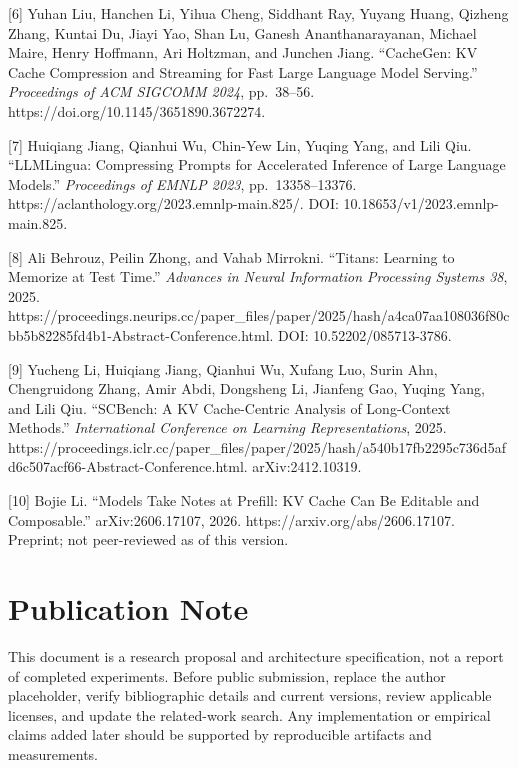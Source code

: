 \documentclass[
  10pt,
]{article}
\begin{document}
{[}6{]} Yuhan Liu, Hanchen Li, Yihua Cheng, Siddhant Ray, Yuyang Huang,
Qizheng Zhang, Kuntai Du, Jiayi Yao, Shan Lu, Ganesh Ananthanarayanan,
Michael Maire, Henry Hoffmann, Ari Holtzman, and Junchen Jiang.
``CacheGen: KV Cache Compression and Streaming for Fast Large Language
Model Serving.'' \emph{Proceedings of ACM SIGCOMM 2024}, pp.~38--56.
https://doi.org/10.1145/3651890.3672274.

{[}7{]} Huiqiang Jiang, Qianhui Wu, Chin-Yew Lin, Yuqing Yang, and Lili
Qiu. ``LLMLingua: Compressing Prompts for Accelerated Inference of Large
Language Models.'' \emph{Proceedings of EMNLP 2023}, pp.~13358--13376.
https://aclanthology.org/2023.emnlp-main.825/. DOI:
10.18653/v1/2023.emnlp-main.825.

{[}8{]} Ali Behrouz, Peilin Zhong, and Vahab Mirrokni. ``Titans:
Learning to Memorize at Test Time.'' \emph{Advances in Neural
Information Processing Systems 38}, 2025.
https://proceedings.neurips.cc/paper\_files/paper/2025/hash/a4ca07aa108036f80cbb5b82285fd4b1-Abstract-Conference.html.
DOI: 10.52202/085713-3786.

{[}9{]} Yucheng Li, Huiqiang Jiang, Qianhui Wu, Xufang Luo, Surin Ahn,
Chengruidong Zhang, Amir Abdi, Dongsheng Li, Jianfeng Gao, Yuqing Yang,
and Lili Qiu. ``SCBench: A KV Cache-Centric Analysis of Long-Context
Methods.'' \emph{International Conference on Learning Representations},
2025.
https://proceedings.iclr.cc/paper\_files/paper/2025/hash/a540b17fb2295c736d5afd6c507acf66-Abstract-Conference.html.
arXiv:2412.10319.

{[}10{]} Bojie Li. ``Models Take Notes at Prefill: KV Cache Can Be
Editable and Composable.'' arXiv:2606.17107, 2026.
https://arxiv.org/abs/2606.17107. Preprint; not peer-reviewed as of this
version.

\section{Publication Note}\label{publication-note}

This document is a research proposal and architecture specification, not
a report of completed experiments. Before public submission, replace the
author placeholder, verify bibliographic details and current versions,
review applicable licenses, and update the related-work search. Any
implementation or empirical claims added later should be supported by
reproducible artifacts and measurements.
\end{document}
